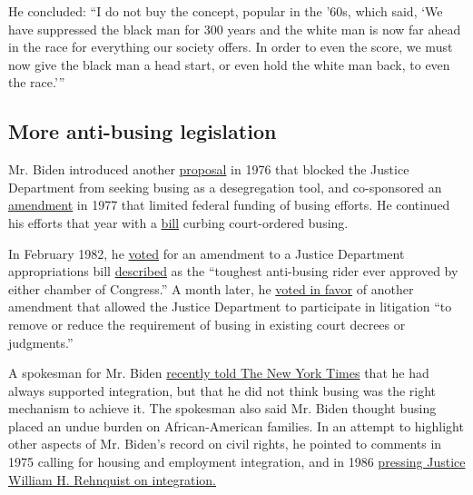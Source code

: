 He concluded: ``I do not buy the concept, popular in the '60s, which
said, `We have suppressed the black man for 300 years and the white man
is now far ahead in the race for everything our society offers. In order
to even the score, we must now give the black man a head start, or even
hold the white man back, to even the race.'''

\hypertarget{more-anti-busing-legislation}{%
\subsection{More anti-busing
legislation}\label{more-anti-busing-legislation}}

Mr. Biden introduced another
\href{https://www.govinfo.gov/content/pkg/GPO-CRECB-1976-pt16/pdf/GPO-CRECB-1976-pt16-5-1.pdf\#page=36}{proposal}
in 1976 that blocked the Justice Department from seeking busing as a
desegregation tool, and co-sponsored an
\href{https://www.washingtonpost.com/archive/politics/1977/06/21/senate-unit-challenges-president/d9f6eac0-0350-4dab-887f-4ffd431ab1f9/}{amendment}
in 1977 that limited federal funding of busing efforts. He continued his
efforts that year with a
\href{https://www.congress.gov/bill/95th-congress/senate-bill/1132/actions?q=\%7B\%22search\%22\%3A\%5B\%22busing\%22\%5D\%7D}{bill}
curbing court-ordered busing.

In February 1982, he
\href{https://www.govinfo.gov/app/details/GPO-CRECB-1982-pt1}{voted} for
an amendment to a Justice Department appropriations bill
\href{https://library.cqpress.com/cqalmanac/document.php?id=cqal82-1164676}{described}
as the ``toughest anti-busing rider ever approved by either chamber of
Congress.'' A month later, he
\href{https://www.govinfo.gov/content/pkg/GPO-CRECB-1982-pt3/pdf/GPO-CRECB-1982-pt3-1.pdf\#page=96}{voted
in favor} of another amendment that allowed the Justice Department to
participate in litigation ``to remove or reduce the requirement of
busing in existing court decrees or judgments.''

A spokesman for Mr. Biden
\href{https://www.nytimes3xbfgragh.onion/2019/06/21/us/politics/joe-biden-james-eastland.html?module=inline}{recently
told The New York Times} that he had always supported integration, but
that he did not think busing was the right mechanism to achieve it. The
spokesman also said Mr. Biden thought busing placed an undue burden on
African-American families. In an attempt to highlight other aspects of
Mr. Biden's record on civil rights, he pointed to comments in 1975
calling for housing and employment integration, and in 1986
\href{https://www.nytimes3xbfgragh.onion/1986/07/31/us/excerpts-from-questioning-of-rehnquist-in-the-senate-judiciary-committee.html?module=inline}{pressing
Justice William H. Rehnquist on integration.}

